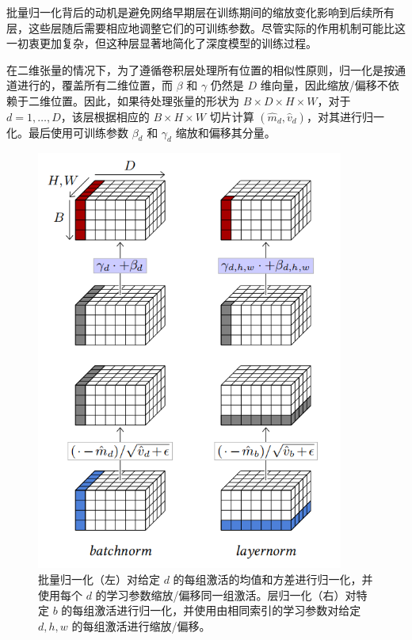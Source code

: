 批量归一化背后的动机是避免网络早期层在训练期间的缩放变化影响到后续所有层，这些层随后需要相应地调整它们的可训练参数。尽管实际的作用机制可能比这一初衷更加复杂，但这种层显著地简化了深度模型的训练过程。

在二维张量的情况下，为了遵循卷积层处理所有位置的相似性原则，归一化是按通道进行的，覆盖所有二维位置，而 $\beta$ 和 $\gamma$ 仍然是 $D$ 维向量，因此缩放/偏移不依赖于二维位置。因此，如果待处理张量的形状为 $B \times D \times H \times W$，对于 $d = 1,\dots,D$，该层根据相应的 $B \times H \times W$ 切片计算 $(\hat{m}_d,\hat{v}_d)$，对其进行归一化。最后使用可训练参数 $\beta_d$ 和 $\gamma_d$ 缩放和偏移其分量。

\begin{figure}
    \centering
    \includegraphics[width=0.9\textwidth]{fig/fig4.9.png}
    \caption[批量归一化]{批量归一化（左）对给定 $d$ 的每组激活的均值和方差进行归一化，并使用每个 $d$ 的学习参数缩放/偏移同一组激活。层归一化（右）对特定 $b$ 的每组激活进行归一化，并使用由相同索引的学习参数对给定 $d,h,w$ 的每组激活进行缩放/偏移。}
    \label{fig4.9}
\end{figure}

